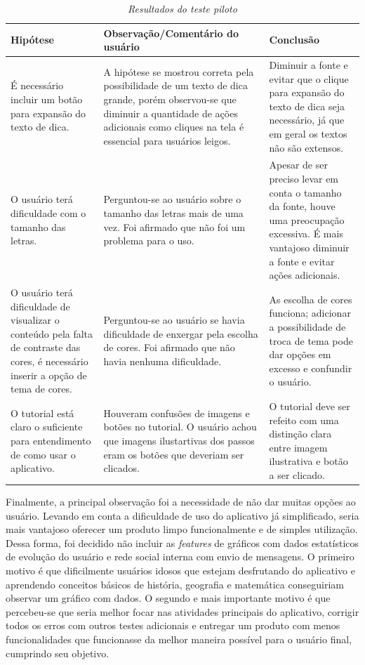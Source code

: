 \begin{table}[H]
\centering
\caption{\textit{Resultados do teste piloto}}
\centering
\footnotesize
\begin{tabular}{p{5cm} p{5cm} p{5cm}}
\toprule
\textbf{Hipótese} & \textbf{Observação/Comentário do usuário} & \textbf{Conclusão}                                   
\\ \midrule
É necessário incluir um botão para expansão 
do texto de dica.
& 
A hipótese se mostrou correta pela possibilidade de um texto de dica grande, porém observou-se que diminuir a quantidade de ações adicionais como cliques na tela é essencial para usuários leigos.
&
Diminuir a fonte e evitar que o clique para expansão do texto de dica seja necessário, já que em geral os textos não são extensos.
\\ \midrule
O usuário terá dificuldade com o tamanho das letras.
& 
Perguntou-se ao usuário sobre o tamanho das letras mais de uma vez. Foi afirmado que não foi um problema para o uso.
&
Apesar de ser preciso levar em conta o tamanho da fonte, houve uma preocupação excessiva. 
É mais vantajoso diminuir a fonte e evitar ações adicionais.
\\ \midrule
O usuário terá dificuldade de visualizar o 
conteúdo pela falta de contraste das cores, é necessário inserir a opção de tema de cores.
& 
Perguntou-se ao usuário se havia dificuldade de enxergar pela escolha de cores. Foi afirmado que não havia nenhuma dificuldade.
&
As escolha de cores funciona; adicionar a possibilidade de troca de tema pode dar opções em excesso e
 confundir o usuário.
\\ \midrule
O tutorial está claro o suficiente para entendimento de como usar o aplicativo.
&
Houveram confusões de imagens e botões
no tutorial. O usuário achou que imagens 
ilustartivas dos passos eram os botões que 
deveriam ser clicados.
&
O tutorial deve ser refeito com uma distinção clara entre imagem ilustrativa e botão a ser clicado.
\\ \midrule
\end{tabular}
\label{tab:feedback-teste-piloto}
\end{table}

Finalmente, a principal observação foi a necessidade de não dar muitas opções ao usuário. Levando em conta a dificuldade de uso do aplicativo já simplificado, seria mais vantajoso oferecer um produto limpo funcionalmente e de simples utilização. Dessa forma, foi decidido não incluir as \textit{features} de gráficos com 
dados estatísticos de evolução do usuário e rede social interna
com envio de mensagens. O primeiro motivo é que dificilmente
usuários idosos que estejam desfrutando do aplicativo e 
aprendendo conceitos básicos de história, geografia e
matemática conseguiriam observar um gráfico com dados.
O segundo e mais importante motivo é que percebeu-se que seria melhor focar
nas atividades principais do aplicativo, corrigir todos os erros com outros testes adicionais
e entregar um produto com menos funcionalidades que
funcionasse da melhor maneira possível para o usuário final, cumprindo seu objetivo.

